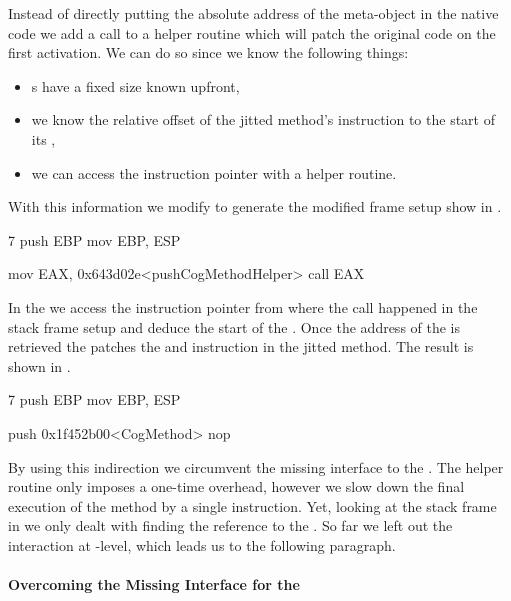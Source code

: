 Instead of directly putting the absolute address of the meta-object in the native code we add a call to a helper routine which will patch the original code on the first activation.
We can do so since we know the following things:
\begin{itemize}[noitemsep,nolistsep]
	\item {}s have a fixed size known upfront,
	\item we know the relative offset of the jitted method's instruction to the start of its ,
	\item we can access the instruction pointer with a helper routine.
\end{itemize}
%
\noindent With this information we modify \NBJ to generate the modified frame setup show in .
%
\begin{numstcode}[
	caption={\NBJ Stack Frame Setup},
	label={lst:val-nabujito-frame-setup}]{7}
push EBP
mov  EBP, ESP

mov  EAX, 0x643d02e<pushCogMethodHelper>
call EAX
\end{numstcode}
%
In the  we access the instruction pointer from where the call happened in the stack frame setup and deduce the start of the .
Once the address of the  is retrieved the  patches the  and  instruction in the jitted method.
The result is shown in .
%
\begin{numstcode}[
	caption={\NBJ Patched Stack Frame Setup},
	label={lst:val-nabujito-patched-frame-setup}]{7}
push EBP
mov  EBP, ESP

push 0x1f452b00<CogMethod>
nop
\end{numstcode}
%
By using this indirection we circumvent the missing interface to the \JIT.
The helper routine only imposes a one-time overhead, however we slow down the final execution of the \NBJ method by a single  instruction.
Yet, looking at the \Cog stack frame in  we only dealt with finding the reference to the .
So far we left out the \GC interaction at \JIT-level, which leads us to the following paragraph.

\paragraph{Overcoming the \GC Missing \VM Interface for the \JIT}

